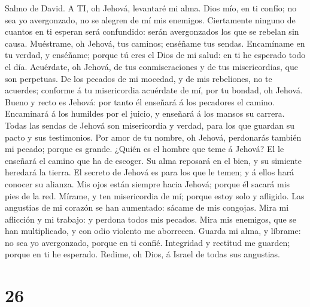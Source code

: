  Salmo de David. A TI, oh Jehová, levantaré mi alma.
 Dios mío, en ti confío; no sea yo avergonzado, no se
alegren de mí mis enemigos.  Ciertamente ninguno de cuantos
en ti esperan será confundido: serán avergonzados los que se rebelan sin
causa.  Muéstrame, oh Jehová, tus caminos; enséñame tus
sendas.  Encamíname en tu verdad, y enséñame; porque tú eres
el Dios de mi salud: en ti he esperado todo el día. 
Acuérdate, oh Jehová, de tus conmiseraciones y de tus misericordias, que
son perpetuas.  De los pecados de mi mocedad, y de mis
rebeliones, no te acuerdes; conforme á tu misericordia acuérdate de mí,
por tu bondad, oh Jehová.  Bueno y recto es Jehová: por
tanto él enseñará á los pecadores el camino.  Encaminará á
los humildes por el juicio, y enseñará á los mansos su carrera.
 Todas las sendas de Jehová son misericordia y verdad, para
los que guardan su pacto y sus testimonios.  Por amor de tu
nombre, oh Jehová, perdonarás también mi pecado; porque es grande.
 ¿Quién es el hombre que teme á Jehová? El le enseñará el
camino que ha de escoger.  Su alma reposará en el bien, y
su simiente heredará la tierra.  El secreto de Jehová es
para los que le temen; y á ellos hará conocer su alianza. 
Mis ojos están siempre hacia Jehová; porque él sacará mis pies de la
red.  Mírame, y ten misericordia de mí; porque estoy solo y
afligido.  Las angustias de mi corazón se han aumentado:
sácame de mis congojas.  Mira mi aflicción y mi trabajo: y
perdona todos mis pecados.  Mira mis enemigos, que se han
multiplicado, y con odio violento me aborrecen.  Guarda mi
alma, y líbrame: no sea yo avergonzado, porque en ti confié.
 Integridad y rectitud me guarden; porque en ti he
esperado.  Redime, oh Dios, á Israel de todas sus
angustias.

\hypertarget{section-25}{%
\section{26}\label{section-25}}

